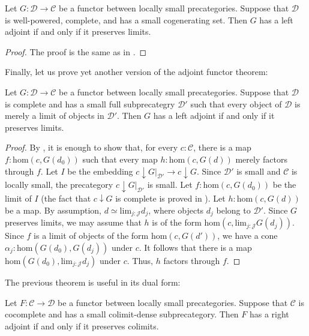 \documentclass[reqno]{amsart}
\theoremstyle{definition}
\theoremstyle{remark}
\newcommand{\fs}[1]{\mathrm{#1}}
\newcommand{\scat}[1]{\mathcal{#1}}
\renewcommand{\hom}{\fs{hom}}
\numberwithin{figure}{section}
\begin{document}
\begin{thm}[saft]
Let $G : \scat{D} \to \scat{C}$ be a functor between locally small precategories.
Suppose that $\scat{D}$ is well-powered, complete, and has a small cogenerating set.
Then $G$ has a left adjoint if and only if it preserves limits.
\end{thm}
\begin{proof}
The proof is the same as in \cite[Theorem~V.8.2]{maclane}.
\end{proof}

Finally, let us prove yet another version of the adjoint functor theorem:

\begin{thm}[yaraft]
Let $G : \scat{D} \to \scat{C}$ be a functor between locally small precategories.
Suppose that $\scat{D}$ is complete and has a small full subprecategry $\scat{D}'$ such that every object of $\scat{D}$ is merely a limit of objects in $\scat{D}'$.
Then $G$ has a left adjoint if and only if it preserves limits.
\end{thm}
\begin{proof}
By , it is enough to show that, for every $c : \scat{C}$, there is a map $f : \hom(c,G(d_0))$ such that every map $h : \hom(c,G(d))$ merely factors through $f$.
Let $I$ be the embedding $c \downarrow G|_{\scat{D}'} \to c \downarrow G$.
Since $\scat{D}'$ is small and $\scat{C}$ is locally small, the precategory $c \downarrow G|_{\scat{D}'}$ is small.
Let $f : \hom(c,G(d_0))$ be the limit of $I$ (the fact that $c \downarrow G$ is complete is proved in \cite[Theorem~V.6.2]{maclane}).
Let $h : \hom(c,G(d))$ be a map.
By assumption, $d \simeq \fs{lim}_{j : \scat{J}} d_j$, where objects $d_j$ belong to $\scat{D}'$.
Since $G$ preserves limits, we may assume that $h$ is of the form $\hom(c,\fs{lim}_{j : \scat{J}} G(d_j))$.
Since $f$ is a limit of objects of the form $\hom(c,G(d'))$, we have a cone $\alpha_j : \hom(G(d_0),G(d_j))$ under $c$.
It follows that there is a map $\hom(G(d_0), \fs{lim}_{j : \scat{J}} d_j)$ under $c$.
Thus, $h$ factors through $f$.
\end{proof}

The previous theorem is useful in its dual form:

\begin{cor}[yalaft]
Let $F : \scat{C} \to \scat{D}$ be a functor between locally small precategories.
Suppose that $\scat{C}$ is cocomplete and has a small colimit-dense subprecategory.
Then $F$ has a right adjoint if and only if it preserves colimits.
\end{cor}



\end{document}
